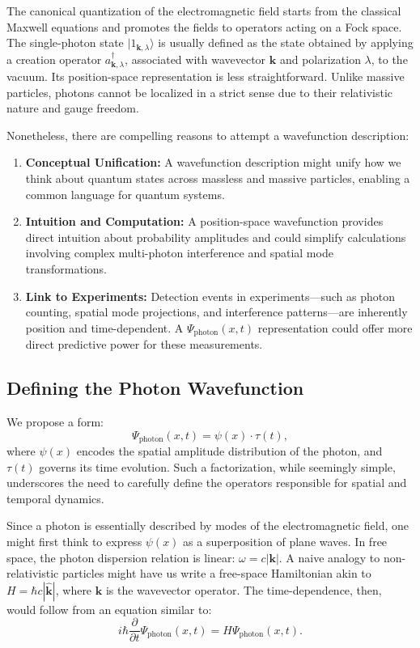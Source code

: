\documentclass[aps,prl,twocolumn,showpacs,showkeys,superscriptaddress,amsmath,amssymb]{revtex4-2}
\begin{document}
The canonical quantization of the electromagnetic field starts from the classical Maxwell equations and promotes the fields to operators acting on a Fock space. The single-photon state $|1_{\mathbf{k},\lambda}\rangle$ is usually defined as the state obtained by applying a creation operator $a^\dagger_{\mathbf{k},\lambda}$, associated with wavevector $\mathbf{k}$ and polarization $\lambda$, to the vacuum. Its position-space representation is less straightforward. Unlike massive particles, photons cannot be localized in a strict sense due to their relativistic nature and gauge freedom.

Nonetheless, there are compelling reasons to attempt a wavefunction description:
\begin{enumerate}
    \item \textbf{Conceptual Unification:} A wavefunction description might unify how we think about quantum states across massless and massive particles, enabling a common language for quantum systems.
    \item \textbf{Intuition and Computation:} A position-space wavefunction provides direct intuition about probability amplitudes and could simplify calculations involving complex multi-photon interference and spatial mode transformations.
    \item \textbf{Link to Experiments:} Detection events in experiments—such as photon counting, spatial mode projections, and interference patterns—are inherently position and time-dependent. A $\Psi_{\text{photon}}(x,t)$ representation could offer more direct predictive power for these measurements.
\end{enumerate}

\subsection{Defining the Photon Wavefunction}

We propose a form:
\begin{equation}
\Psi_{\text{photon}}(x,t) = \psi(x)\cdot\tau(t),
\end{equation}
where $\psi(x)$ encodes the spatial amplitude distribution of the photon, and $\tau(t)$ governs its time evolution. Such a factorization, while seemingly simple, underscores the need to carefully define the operators responsible for spatial and temporal dynamics.

Since a photon is essentially described by modes of the electromagnetic field, one might first think to express $\psi(x)$ as a superposition of plane waves. In free space, the photon dispersion relation is linear: $\omega = c|\mathbf{k}|$. A naive analogy to non-relativistic particles might have us write a free-space Hamiltonian akin to $H = \hbar c |\hat{\mathbf{k}}|$, where $\hat{\mathbf{k}}$ is the wavevector operator. The time-dependence, then, would follow from an equation similar to:
\begin{equation}
i\hbar\frac{\partial}{\partial t}\Psi_{\text{photon}}(x,t) = H\Psi_{\text{photon}}(x,t).
\end{equation}
\end{document}
